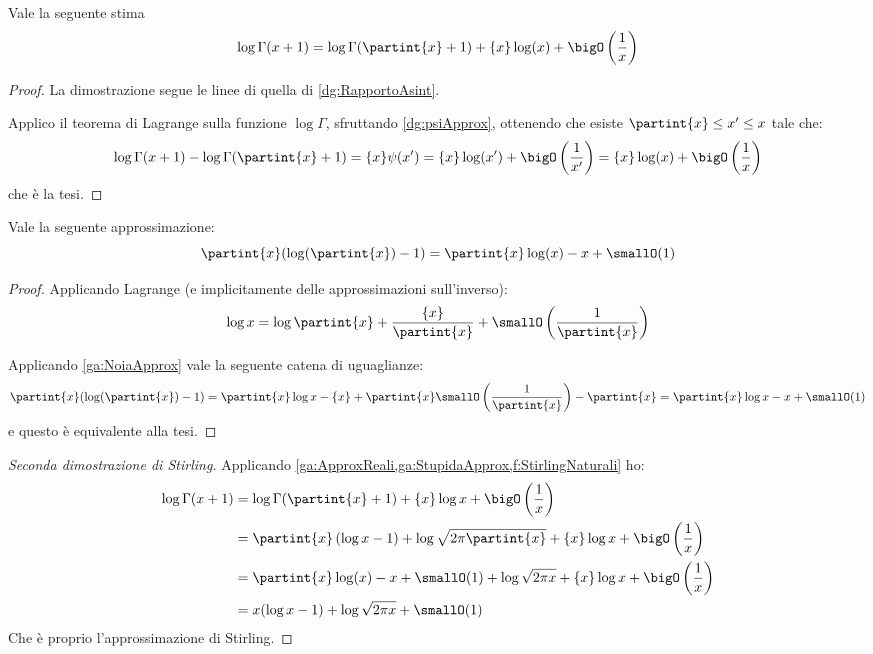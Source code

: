 \begin{lemma}\label{ga:ApproxReali}
	Vale la seguente stima
	\begin{equation*}
		\log{\Gamma(x+1)}=\log{\Gamma(\partint{x} +1)}+\{x\}\log(x)+\bigO\left(\frac 1x\right)
	\end{equation*}
\end{lemma}
\begin{proof}
	La dimostrazione segue le linee di quella di \cref{dg:RapportoAsint}.
	
	Applico il teorema di Lagrange sulla funzione $\log\Gamma$, sfruttando \cref{dg:psiApprox}, ottenendo che esiste
	$\partint{x}\le x'\le x$ tale che:
	\begin{equation}
		\log{\Gamma(x+1)}-\log{\Gamma(\partint{x} +1)}=\{x\}\psi(x')=\{x\}\log(x')+\bigO\left(\frac 1{x'}\right)=
		\{x\}\log(x)+\bigO\left(\frac 1x\right)
	\end{equation}
	che è la tesi.
\end{proof}

\begin{lemma}\label{ga:StupidaApprox}
	Vale la seguente approssimazione:
	\begin{equation*}
		\partint{x}(\log(\partint{x})-1)=\partint{x} \log(x)-x+\smallO(1)
	\end{equation*}
\end{lemma}
\begin{proof}
	Applicando Lagrange (e implicitamente delle approssimazioni sull'inverso):
	\begin{equation}\label{ga:NoiaApprox}
		\log{x}=\log{\partint{x}} + \frac{\{x\}}{\partint{x}} +\smallO\left(\frac 1{\partint{x}}\right)
	\end{equation}
	
	Applicando \cref{ga:NoiaApprox} vale la seguente catena di uguaglianze:
	\begin{equation*}
		\partint{x}(\log(\partint{x})-1)=\partint{x}\log{x}-\{x\}+
		\partint{x}\smallO\left(\frac 1{\partint{x}}\right)-\partint{x}=
		\partint{x}\log{x}-x+\smallO(1)
	\end{equation*}
	e questo è equivalente alla tesi.
\end{proof}



\begin{proof}[Seconda dimostrazione di Stirling]
	Applicando \cref{ga:ApproxReali,ga:StupidaApprox,f:StirlingNaturali} ho:
	\begin{equation*}\begin{split}
		\log{\Gamma(x+1)}&=\log\Gamma(\partint{x}+1)+\{x\}\log{x}+\bigO\left(\frac 1x\right)\\
		&=\partint{x}\left(\log{x}-1\right)+\log{\sqrt{2\pi\partint{x}}}+\{x\}\log{x}+\bigO\left(\frac 1x\right)\\
		&=\partint{x} \log(x)-x+\smallO(1)+\log{\sqrt{2\pi x}}+\{x\}\log{x}+\bigO\left(\frac 1x\right)\\
		&=x(\log{x}-1)+\log{\sqrt{2\pi x}}+\smallO(1)
	\end{split}\end{equation*}
	Che è proprio l'approssimazione di Stirling.
\end{proof}







